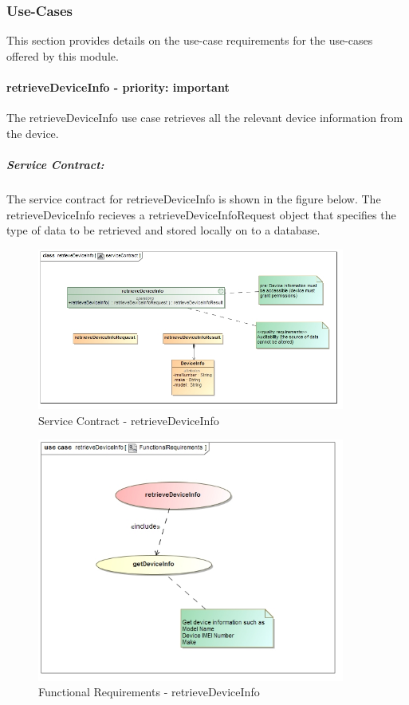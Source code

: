 \documentclass[hidelinks, 12pt, oneside]{article}
\begin{document}
		
	\subsubsection{Use-Cases}
		This section provides details on the use-case requirements for the use-cases offered by this module.	
		
	\paragraph{retrieveDeviceInfo - priority: important}
		The retrieveDeviceInfo use case retrieves all the relevant device information from the device.\newline
		
		\subparagraph{Service Contract:}
		The service contract for retrieveDeviceInfo is shown in the figure below. The retrieveDeviceInfo 			recieves a retrieveDeviceInfoRequest object that specifies the type of data to be retrieved and 			stored locally on to a database.
		
		
		\begin{figure}[!htbp]
    		\centering
    		\includegraphics[width=0.9\textwidth]{img/serviceContractRetrieveDeviceInfo.jpg}
    		\caption{Service Contract - retrieveDeviceInfo}
    		\label{fig:ServiceCon_retrieveDeviceInfo}
		\end{figure}
				
		
		\begin{figure}[!htbp]
    		\centering
    		\includegraphics[width=0.9\textwidth]{img/functionalRequirementsRetrieveDeviceInfo.jpg}
    		\caption{Functional Requirements - retrieveDeviceInfo}
    		\label{fig:FunctionalReq_retrieveDeviceInfo}
		\end{figure}
		
\end{document}

